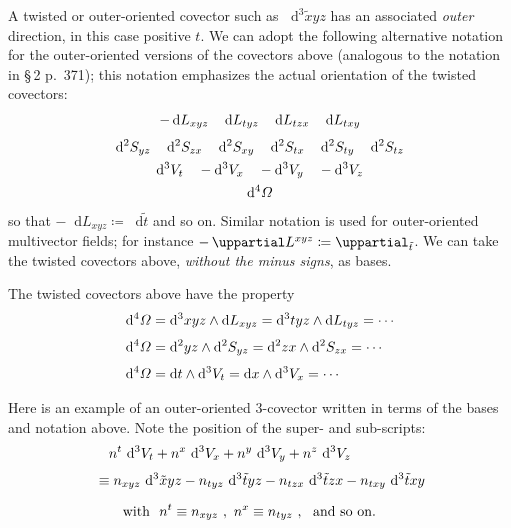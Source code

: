 \documentclass[a4paper,12pt,%
onecolumn,oneside,article,%
british%
]{memoir}
\theoremstyle{remark}
\theoremstyle{innote}
\newcommand*{\de}{\mathop{}\!\uppartial}%
\newcommand*{\di}{\mathop{}\!\mathrm{d}}%
\newcommand*{\defd}{\coloneqq}
\renewcommand*{\|}[1][]{\nonscript\:#1\vert\nonscript\:\mathopen{}}
\newcommand*{\sect}{\S}%
\newcommand*{\se}[1]{\de_{#1}}
\newcommand*{\si}[1]{\di{#1}}
\newcommand*{\ssi}[1]{\di^{2}{#1}}
\newcommand*{\sssi}[1]{\di^{3}{#1}}
\newcommand*{\tw}[1]{\tilde{#1}}
\newcommand*{\te}[1]{\de L^{#1}}
\newcommand*{\ti}[1]{\di L_{#1}}
\newcommand*{\tti}[1]{\di^{2}S_{#1}}
\newcommand*{\ttti}[1]{\di^{3}V_{#1}}
\newcommand*{\tttti}[1]{\di^{4}\varOmega_{#1}}
\begin{document}
A twisted or outer-oriented covector such as $\sssi{\tw{x}yz}$ has an associated \emph{outer} direction, in this case positive $t$. We can adopt the following alternative notation for the outer-oriented versions of the covectors above (analogous to the notation in \cites{gotayetal1992} \sect\,2 p.~371); this notation emphasizes the actual orientation of the twisted covectors:
\begin{subequations}\label{eq:basis_twshort}
  \begin{gather}
    \label{eq:basis_1vec_twshort}
    -\ti{xyz}\quad
    \ti{tyz}\quad
    \ti{tzx}\quad
    \ti{txy}
    \\[\jot]
    \label{eq:basis_2vec_twshort}
    \tti{yz}\quad
    \tti{zx}\quad
    \tti{xy}\quad
    \tti{tx}\quad
    \tti{ty}\quad
    \tti{tz}
    \\
    \label{eq:basis_3vec_twshort}
    \ttti{t}\quad
    -\ttti{x}\quad
    -\ttti{y}\quad
    -\ttti{z}
    \\
    \label{eq:basis_4vec_twshort}
    \tttti{}
  \end{gather}
\end{subequations}
so that $-\ti{xyz} \defd \si{\tw{t}}$ and so on. Similar notation is used for outer-oriented multivector fields; for instance $-\te{xyz} \defd \se{\tw{t}}$. We can take the twisted covectors above, \emph{without the minus signs}, as bases.

The twisted covectors above have the property
\begin{equation}
  \label{eq:gives_volform}
  \begin{aligned}
    \tttti{} &=
    \sssi{xyz} \land \ti{xyz} = \sssi{tyz} \land \ti{tyz} = \dotsb
    \\[\jot]
    \tttti{} &=
    \ssi{yz} \land \tti{yz} = \ssi{zx} \land \tti{zx} = \dotsb
    \\[\jot]
    \tttti{} &=
    \si{t} \land \ttti{t} = \si{x} \land \ttti{x} = \dotsb
  \end{aligned}
\end{equation}


Here is an example of an outer-oriented 3-covector written in terms of the bases and notation above. Note the position of the super- and sub-scripts:
\begin{equation}
  \label{eq:examples_expansion}
  \begin{split}
    &\quad
    n^{t}\,\ttti{t} +
    n^{x}\,\ttti{x} +
    n^{y}\,\ttti{y} +
    n^{z}\,\ttti{z}
    \\[\jot]
    &\equiv
    n_{xyz}\,\sssi{\tw{x}yz}
    -n_{tyz}\,\sssi{\tw{t}yz}
    -n_{tzx}\,\sssi{\tw{t}zx}
    -n_{txy}\,\sssi{\tw{t}xy}
    \\[2\jot]
    &\qquad\text{with }\ 
    n^{t} \equiv n_{xyz}\ ,\
    n^{x} \equiv n_{tyz}\ ,\
    \text{ and so on}.
  \end{split}
\end{equation}
\end{document}

